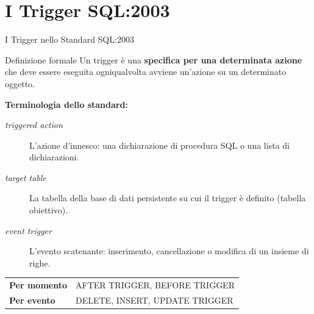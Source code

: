 \documentclass[aspectratio=169]{beamer}
\begin{document}
\section{I Trigger SQL:2003}

\begin{frame}{I Trigger nello Standard SQL:2003}
  \begin{block}{Definizione formale}
    Un trigger è una \textbf{specifica per una determinata azione} che deve
    essere eseguita ogniqualvolta avviene un'azione su un determinato oggetto.
  \end{block}
  \vspace{0.2cm}
  \textbf{Terminologia dello standard:}
  \begin{description}
    \item[\textit{triggered action}] L'azione d'innesco: una dichiarazione di
      procedura SQL o una lista di dichiarazioni.
    \item[\textit{target table}] La tabella della base di dati persistente su cui
      il trigger è definito (tabella obiettivo).
    \item[\textit{event trigger}] L'evento scatenante: inserimento, cancellazione
      o modifica di un insieme di righe.
  \end{description}
  \vspace{0.2cm}
  \begin{center}
    \begin{tabular}{ll}
      \toprule
      \textbf{Per momento} & AFTER TRIGGER, BEFORE TRIGGER \\
      \textbf{Per evento}  & DELETE, INSERT, UPDATE TRIGGER \\
      \bottomrule
    \end{tabular}
  \end{center}
\end{frame}
\end{document}
